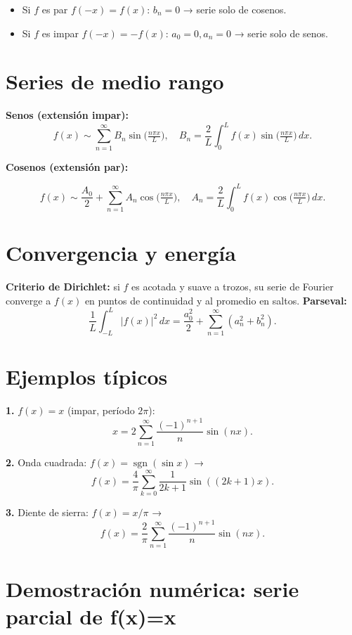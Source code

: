 \documentclass[
  letterpaper,
  DIV=11,
  numbers=noendperiod]{scrreprt}
\providecommand{\tightlist}{%
  \setlength{\itemsep}{0pt}\setlength{\parskip}{0pt}}
\begin{document}
\begin{itemize}
\tightlist
\item
  Si \(f\) es par \(f(-x)=f(x)\): \(b_n=0\) → serie solo de cosenos.
\item
  Si \(f\) es impar \(f(-x)=-f(x)\): \(a_0=0,a_n=0\) → serie solo de
  senos.
\end{itemize}

\section{Series de medio rango}\label{series-de-medio-rango}

\textbf{Senos (extensión impar):} \[
f(x) \sim \sum_{n=1}^{\infty} B_n \sin\!\big(\tfrac{n\pi x}{L}\big), \quad B_n = \frac{2}{L}\int_{0}^{L} f(x)\sin\!\big(\tfrac{n\pi x}{L}\big)\,dx.
\]

\textbf{Cosenos (extensión par):}

\[
f(x) \sim \frac{A_0}{2} + \sum_{n=1}^{\infty} A_n \cos\!\big(\tfrac{n\pi x}{L}\big), \quad
A_n = \frac{2}{L}\int_{0}^{L} f(x)\cos\!\big(\tfrac{n\pi x}{L}\big)\,dx.
\]

\section{Convergencia y energía}\label{convergencia-y-energuxeda}

\textbf{Criterio de Dirichlet:} si \(f\) es acotada y suave a trozos, su
serie de Fourier converge a \(f(x)\) en puntos de continuidad y al
promedio en saltos. \textbf{Parseval:} \[
\frac{1}{L}\int_{-L}^{L} |f(x)|^2\,dx = \frac{a_0^2}{2} + \sum_{n=1}^{\infty} (a_n^2 + b_n^2).
\]

\section{Ejemplos típicos}\label{ejemplos-tuxedpicos}

\textbf{1.} \(f(x)=x\) (impar, período \(2\pi\)): \[
x = 2 \sum_{n=1}^{\infty} \frac{(-1)^{n+1}}{n}\sin(nx).
\]

\textbf{2.} Onda cuadrada: \(f(x)=\operatorname{sgn}(\sin x)\) → \[
f(x) = \frac{4}{\pi} \sum_{k=0}^{\infty} \frac{1}{2k+1}\sin((2k+1)x).
\]

\textbf{3.} Diente de sierra: \(f(x)=x/\pi\) → \[
f(x) = \frac{2}{\pi} \sum_{n=1}^{\infty} \frac{(-1)^{n+1}}{n}\sin(nx).
\]

\section{Demostración numérica: serie parcial de
f(x)=x}\label{demostraciuxf3n-numuxe9rica-serie-parcial-de-fxx}
\end{document}
